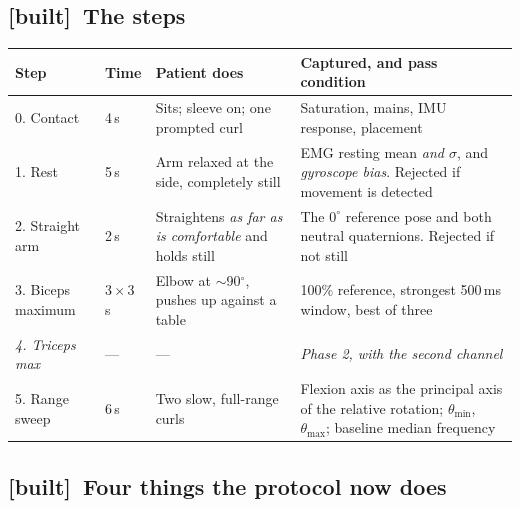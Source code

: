 \documentclass[11pt]{article}
\newcommand{\built}{{\sffamily\scriptsize\color{good}\textbf{[built]}}\ }
\begin{document}
\subsection{\built The steps}

\begin{table}[H]
\centering\small
\begin{tabularx}{\linewidth}{@{}p{20mm} p{9mm} p{34mm} X@{}}
\toprule
\textbf{Step} & \textbf{Time} & \textbf{Patient does} & \textbf{Captured, and pass condition} \\
\midrule
0. Contact & 4\,s & Sits; sleeve on; one prompted curl & Saturation, mains, IMU response, placement \\[3pt]
1. Rest & 5\,s & Arm relaxed at the side, completely still & EMG resting mean \emph{and $\sigma$}, and \emph{gyroscope bias}. Rejected if movement is detected \\[3pt]
2. Straight arm & 2\,s & Straightens \emph{as far as is comfortable} and holds still & The $0^{\circ}$ reference pose and both neutral quaternions. Rejected if not still \\[3pt]
3. Biceps maximum & $3 \times 3$\,s & Elbow at $\sim$90$^{\circ}$, pushes up against a table & 100\% reference, strongest 500\,ms window, best of three \\[3pt]
\textit{4. Triceps max} & --- & --- & \textit{Phase 2, with the second channel} \\[3pt]
5. Range sweep & 6\,s & Two slow, full-range curls & Flexion axis as the principal axis of the relative rotation; $\theta_{\min}$, $\theta_{\max}$; baseline median frequency \\
\bottomrule
\end{tabularx}
\end{table}

\subsection{\built Four things the protocol now does}
\end{document}
